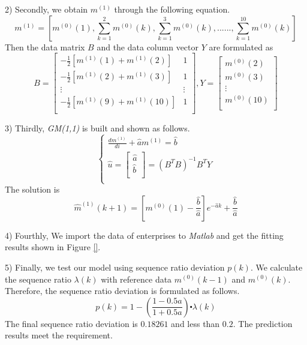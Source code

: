 \documentclass{apmcmthesis}
\begin{document}
2) Secondly, we obtain $m^{(1)}$ through the following equation.
\begin{equation}
{{m}^{(1)}}=[{{m}^{(0)}}(1),\sum\limits_{k=1}^{2}{{{m}^{(0)}}(k)},\sum\limits_{k=1}^{3}{{{m}^{(0)}}(k)},......,\sum\limits_{k=1}^{10}{{{m}^{(0)}}(k)}]
\end{equation}
Then the data matrix $B$ and the data column vector $Y$ are formulated as
\begin{equation}
B=\left[ \begin{matrix}
   -\frac{1}{2}[{{m}^{(1)}}(1)+{{m}^{(1)}}(2)] & 1  \\
   -\frac{1}{2}[{{m}^{(1)}}(2)+{{m}^{(1)}}(3)] & 1  \\
   \vdots  & \vdots   \\
   -\frac{1}{2}[{{m}^{(1)}}(9)+{{m}^{(1)}}(10)] & 1  \\
\end{matrix} \right]
, 
Y=\left[ \begin{matrix}
   {{m}^{(0)}}(2)  \\
   {{m}^{(0)}}(3)  \\
   \vdots   \\
   {{m}^{(0)}}(10)  \\
\end{matrix} \right]
\end{equation}

3) Thirdly, \textit{GM(1,1)} is built and shown as follows.
\begin{equation}
\left\{ \begin{array}{*{35}{l}}
   \frac{d{{m}^{(1)}}}{di}+\hat{a}{{m}^{(1)}}=\hat{b}  \\
   \hat{u}=\left[ \begin{array}{*{35}{l}}
   {\hat{a}}  \\
   {\hat{b}}  \\
\end{array} \right]={{({{B}^{T}}B)}^{-1}}{{B}^{T}}Y  \\
\end{array} \right.
\end{equation}
The solution is
\begin{equation}
{{\hat{m}}^{(1)}}(k+1)=[{{m}^{(0)}}(1)-\frac{{\hat{b}}}{{\hat{a}}}]{{e}^{-\hat{a}k}}+\frac{{\hat{b}}}{{\hat{a}}}
\end{equation}

4) Fourthly, We import the data of enterprises to \textit{Matlab} and get the fitting results shown in Figure \ref{}.

5) Finally, we test our model using sequence ratio deviation         $p(k)$. We calculate the sequence ratio $\lambda(k)$ with reference data $m^{(0)}(k-1)$ and $m^{(0)}(k)$. Therefore, the sequence ratio deviation is formulated as follows.
\begin{equation}
p(k)=1-(\frac{1-0.5a}{1+0.5a})\centerdot \lambda (k)
\end{equation}
The final sequence ratio deviation is $0.18261$ and less than $0.2$. The prediction results meet the requirement.
\end{document}
